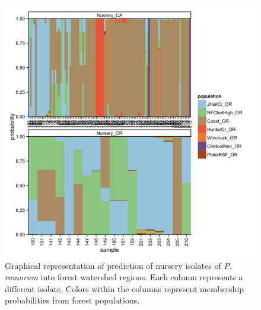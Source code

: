 \documentclass[double,11pt]{beavtex}
\begin{document}
  \begin{figure}
  
  {\centering \includegraphics[width=0.8\linewidth]{figure/phytopathology/figureS7} 
  
  }
  
  \caption[Graphical representation of prediction of nursery isolates of \emph{P.
  ramorum} into forest watershed regions.]{Graphical representation of prediction of nursery isolates of \emph{P.
  ramorum} into forest watershed regions. Each column represents a
  different isolate. Colors within the columns represent membership
  probabilities from forest populations.}\label{fig:ramS7}
  \end{figure}
  
\end{document}
